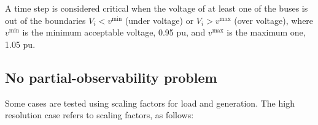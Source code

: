 A time step is considered critical when the voltage of at least one of the buses is out of the boundaries $V_i < v^{\text{min}}$ (under voltage) or $V_i > v^{\text{max}}$ (over voltage), where $v^{\text{min}}$ is the minimum acceptable voltage, 0.95 \gls{pu}, and $v^{\text{max}}$ is the maximum one, 1.05 \gls{pu}.







\subsection{No partial-observability problem}
Some cases are tested using scaling factors for load and generation. The high resolution case refers to scaling factors, as follows:
\begin{algorithm}[H]
    
\end{algorithm}

